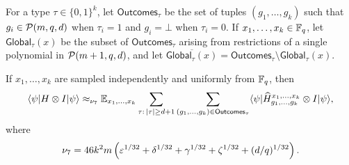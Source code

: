 \begin{definition}\label{def:outcomes-by-type}
	\leanok
	For a type $\tau \in \{0,1\}^k$, let $\mathsf{Outcomes}_\tau$ be the set of tuples $(g_1,\dots,g_k)$ such that $g_i \in \mathcal{P}(m,q,d)$ when $\tau_i=1$ and $g_i=\bot$ when $\tau_i=0$. If $x_1,\dots,x_k \in \mathbb{F}_q$, let $\mathsf{Global}_\tau(x)$ be the subset of $\mathsf{Outcomes}_\tau$ arising from restrictions of a single polynomial in $\mathcal{P}(m+1,q,d)$, and let $\overline{\mathsf{Global}_\tau(x)} = \mathsf{Outcomes}_\tau \setminus \mathsf{Global}_\tau(x)$.
\end{definition}

\begin{lemma}\label{lem:over-all-outcomes}
	\leanok
	If $x_1,\dots,x_k$ are sampled independently and uniformly from $\mathbb{F}_q$, then
	\[
		\langle \psi \rvert H \otimes I \lvert \psi \rangle
		\approx_{\nu_7}
		\mathbb{E}_{x_1,\dots,x_k} \sum_{\tau:\,|\tau|\ge d+1} \sum_{(g_1,\dots,g_k)\in \mathsf{Outcomes}_\tau}
		\langle \psi \rvert \widehat H_{g_1,\dots,g_k}^{x_1,\dots,x_k} \otimes I \lvert \psi \rangle,
	\]
	where
	\[
		\nu_7 = 46k^2m\left(\varepsilon^{1/32}+\delta^{1/32}+\gamma^{1/32}+\zeta^{1/32}+(d/q)^{1/32}\right).
	\]
\end{lemma}
